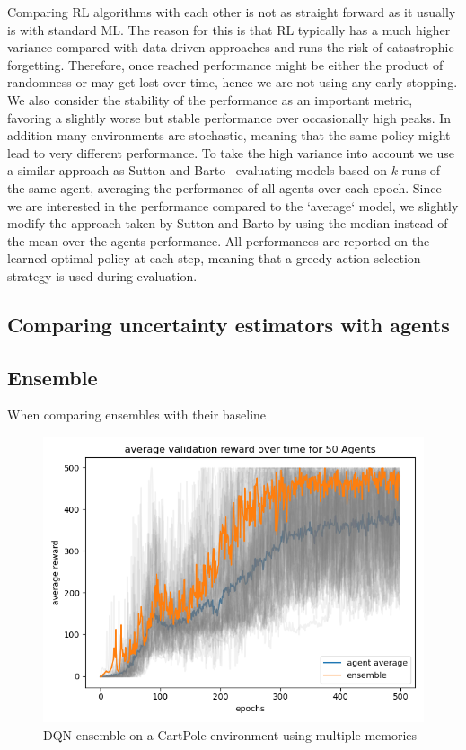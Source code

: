 \documentclass[11pt,a4paper]{article}
\begin{document}
	Comparing RL algorithms with each other is not as straight forward as it usually is with standard ML\@.
	The reason for this is that RL typically has a much higher variance compared with data driven approaches and runs the risk of catastrophic forgetting.
	Therefore, once reached performance might be either the product of randomness or may get lost over time, hence we are not using any early stopping.
	We also consider the stability of the performance as an important metric, favoring a slightly worse but stable performance over occasionally high peaks.
	In addition many environments are stochastic, meaning that the same policy might lead to very different performance.
	To take the high variance into account we use a similar approach as Sutton and Barto~\cite{sutton_introduction_1998} evaluating models based on $k$ runs of the same agent, averaging the performance of all agents over each epoch.
	Since we are interested in the performance compared to the `average` model, we slightly modify the approach taken by Sutton and Barto by using the median instead of the mean over the agents performance.
	All performances are reported on the learned optimal policy at each step, meaning that a greedy action selection strategy is used during evaluation.



	\subsection{Comparing uncertainty estimators with agents} \label{subsec:comparing-uncertainty-estimators-with-agents}

	\subsection{Ensemble}\label{subsec:ensemble2}
	When comparing ensembles with their baseline
	\begin{figure}
		\label{fig:ddqn_cartpole_ensemble}
		\centering
		\includegraphics[width=0.8\linewidth]{../../dqn/cartpole/ensemble/exp_39/avg_ensemble_val_rewards.png}
		\caption{DQN ensemble on a CartPole environment using multiple memories}
	\end{figure}
\end{document}
